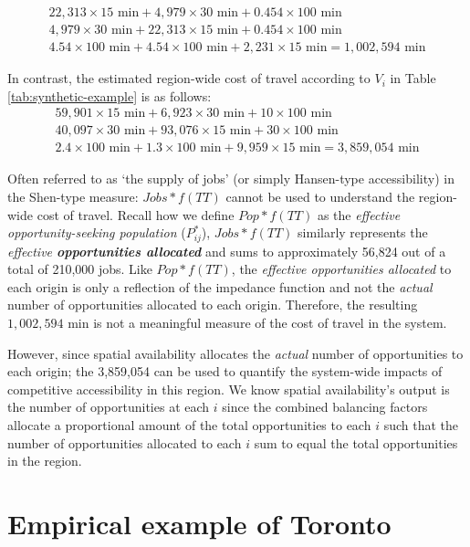 \documentclass[10pt,letterpaper]{article}
\begin{document}
\[
\begin{array}{l}
22,313\times 15 \text{ min} + 4,979\times 30 \text{ min} + 0.454\times 100 \text{ min}\\
4,979\times 30 \text{ min} + 22,313\times 15 \text{ min} + 0.454\times 100 \text{ min}\\
4.54\times 100 \text{ min} + 4.54\times 100 \text{ min} + 2,231\times 15 \text{ min} = 1,002,594\text{ min}
\end{array}
\]

In contrast, the estimated region-wide cost of travel according to
\(V_i\) in Table \ref{tab:synthetic-example} is as follows: \[
\begin{array}{l}
59,901\times 15 \text{ min} + 6,923\times 30 \text{ min} + 10\times 100 \text{ min}\\
40,097\times 30 \text{ min} + 93,076\times 15 \text{ min} + 30\times 100 \text{ min}\\
2.4\times 100 \text{ min} + 1.3\times 100 \text{ min} + 9,959\times 15 \text{ min} = 3,859,054\text{ min}
\end{array}
\]

Often referred to as `the supply of jobs' (or simply Hansen-type
accessibility) in the Shen-type measure: \(Jobs*f(TT)\) cannot be used
to understand the region-wide cost of travel. Recall how we define
\(Pop*f(TT)\) as the \emph{effective opportunity-seeking population}
(\(P^*_{ij}\)), \(Jobs*f(TT)\) similarly represents the \emph{effective
\textbf{opportunities allocated}} and sums to approximately 56,824 out
of a total of 210,000 jobs. Like \(Pop*f(TT)\), the \emph{effective
opportunities allocated} to each origin is only a reflection of the
impedance function and not the \emph{actual} number of opportunities
allocated to each origin. Therefore, the resulting
\(1,002,594\text{ min}\) is not a meaningful measure of the cost of
travel in the system.

However, since spatial availability allocates the \emph{actual} number
of opportunities to each origin; the 3,859,054 can be used to
quantify the system-wide impacts of competitive accessibility in this
region. We know spatial availability's output is the number of
opportunities at each \(i\) since the combined balancing factors
allocate a proportional amount of the total opportunities to each \(i\)
such that the number of opportunities allocated to each \(i\) sum to
equal the total opportunities in the region.

\hypertarget{empirical-example-of-toronto}{%
\section{Empirical example of
Toronto}\label{empirical-example-of-toronto}}
\end{document}
